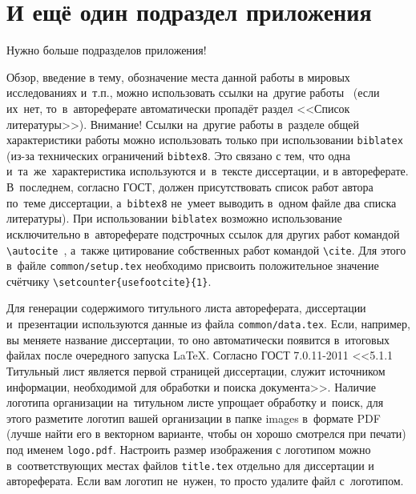 \section{И ещё один подраздел приложения}\label{app:B6}

Нужно больше подразделов приложения!

\clearpage
{}




Обзор, введение в тему, обозначение места данной работы в
мировых исследованиях и~т.\:п., можно использовать ссылки на~другие
работы~\autocite{Gosele1999161,Lermontov}
(если их~нет, то~в~автореферате
автоматически пропадёт раздел <<Список литературы>>). Внимание! Ссылки
на~другие работы в~разделе общей характеристики работы можно
использовать только при использовании \verb!biblatex! (из-за технических
ограничений \verb!bibtex8!. Это связано с тем, что одна
и~та~же~характеристика используются и~в~тексте диссертации, и в
автореферате. В~последнем, согласно ГОСТ, должен присутствовать список
работ автора по~теме диссертации, а~\verb!bibtex8! не~умеет выводить в~одном
файле два списка литературы).
При использовании \verb!biblatex! возможно использование исключительно
в~автореферате подстрочных ссылок
для других работ командой \verb!\autocite!~\autocite{Marketing}, а~также цитирование
собственных работ командой \verb!\cite!. Для этого в~файле
\verb!common/setup.tex! необходимо присвоить положительное значение
счётчику \verb!\setcounter{usefootcite}{1}!.

Для генерации содержимого титульного листа автореферата, диссертации
и~презентации используются данные из файла \verb!common/data.tex!. Если,
например, вы меняете название диссертации, то оно автоматически
появится в~итоговых файлах после очередного запуска \LaTeX. Согласно
ГОСТ 7.0.11-2011 <<5.1.1 Титульный лист является первой страницей
диссертации, служит источником информации, необходимой для обработки и
поиска документа>>. Наличие логотипа организации на~титульном листе
упрощает обработку и~поиск, для этого разметите логотип вашей
организации в папке images в~формате PDF (лучше найти его в векторном
варианте, чтобы он хорошо смотрелся при печати) под именем
\verb!logo.pdf!. Настроить размер изображения с логотипом можно
в~соответствующих местах файлов \verb!title.tex!  отдельно для
диссертации и автореферата. Если вам логотип не~нужен, то просто
удалите файл с~логотипом.

